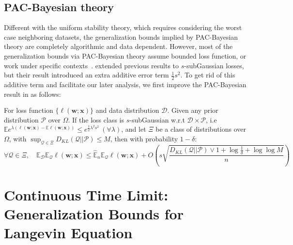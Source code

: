 \documentclass[final,12pt]{colt2018} %
\begin{document}
\subsection{PAC-Bayesian theory}
Different with the uniform stability theory, which requires considering the worst case neighboring datasets, the generalization bounds implied by PAC-Bayesian theory are completely algorithmic and data dependent. However, most of the generalization bounds via PAC-Bayesian theory assume bounded loss function, or work under specific contexts~\citep{dalalyan2012sparse}. \citet{germain2016pac} extended previous results to $s$-subGaussian losses, but their result introduced an extra additive error term $\frac{1}{2}s^2$. To get rid of this additive term and facilitate our later analysis, we first improve the PAC-Bayesian result in \citet{germain2016pac} as follows:
\begin{theorem}
\label{PAC-Bayesian}
For loss function $\{\ell(\bm{w};\bm{x})\}$ and data distribution $\mathcal{D}$. Given any prior distribution $\mathcal{P}$ over $\Omega$. If the loss class is $s$-subGaussian w.r.t $\mathcal{D}\times \mathcal{P}$, i.e $\mathbb{E} e^{\lambda (\ell(\bm{w};\bm{x}) - \mathbb{E}\ell(\bm{w};\bm{x}))}\leq e^{\frac{1}{2}\lambda^2s^2} ~(\forall \lambda)$, and let
$\Xi$ be a class of distributions over $\Omega$, with $\sup_{\mathcal{Q}\in\Xi} D_{KL}(\mathcal{Q}||\mathcal{P})\leq M$, then with probability $1-\delta$:
\begin{equation*}
 \forall \mathcal{Q}\in \Xi, \quad \mathbb{E}_{\mathcal{D}}\mathbb{E}_{\mathcal{Q}} \ell(\bm{w};\bm{x})\leq \hat{\mathbb{E}}_n \mathbb{E}_{\mathcal{Q}}\ell(\bm{w};\bm{x}) +O\left(s\sqrt{\frac{D_{KL}(\mathcal{Q}||\mathcal{P})\vee 1+\log\frac{1}{\delta}+\log\log M}{n}}\right)
\end{equation*}
\end{theorem} 
\section{Continuous Time Limit: Generalization Bounds for Langevin Equation}
\end{document}
